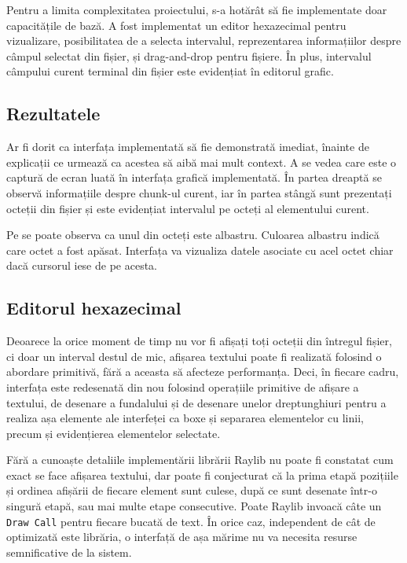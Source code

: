 \documentclass[a4paper,12pt]{report}
\begin{document}

Pentru a limita complexitatea proiectului, s-a hotărât să fie implementate doar capacitățile de bază.
A fost implementat un editor hexazecimal pentru vizualizare, posibilitatea de a selecta intervalul,
reprezentarea informațiilor despre câmpul selectat din fișier, și drag-and-drop pentru fișiere.
În plus, intervalul câmpului curent terminal din fișier este evidențiat în editorul grafic.

\subsection{Rezultatele}

Ar fi dorit ca interfața implementată să fie demonstrată imediat,
înainte de explicații ce urmează ca acestea să aibă mai mult context.
A se vedea  care este o captură de ecran luată în interfața grafică implementată.
În partea dreaptă se observă informațiile despre chunk-ul curent,
iar în partea stângă sunt prezentați octeții din fișier
și este evidențiat intervalul pe octeți al elementului curent.


Pe  se poate observa ca unul din octeți este albastru.
Culoarea albastru indică care octet a fost apăsat.
Interfața va vizualiza datele asociate cu acel octet chiar dacă cursorul iese de pe acesta.


\subsection{Editorul hexazecimal}

Deoarece la orice moment de timp nu vor fi afișați toți octeții din întregul fișier,
ci doar un interval destul de mic, afișarea textului poate fi realizată folosind o abordare primitivă,
fără a aceasta să afecteze performanța.
Deci, în fiecare cadru, interfața este redesenată din nou folosind operațiile primitive
de afișare a textului, de desenare a fundalului și de desenare unelor dreptunghiuri
pentru a realiza așa elemente ale interfeței ca boxe și separarea elementelor cu linii,
precum și evidențierea elementelor selectate.

Fără a cunoaște detaliile implementării librării Raylib nu poate fi constatat cum exact se face afișarea textului,
dar poate fi conjecturat că la prima etapă pozițiile și ordinea afișării de fiecare element sunt culese,
după ce sunt desenate într-o singură etapă, sau mai multe etape consecutive.
Poate Raylib invoacă câte un \texttt{Draw Call} pentru fiecare bucată de text.
În orice caz, independent de cât de optimizată este librăria,
o interfață de așa mărime nu va necesita resurse semnificative de la sistem.
\end{document}
